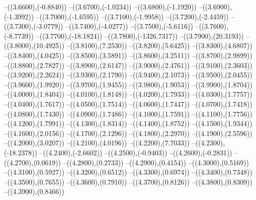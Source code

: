{	--({\sx*(3.6600)},{\sy*(-0.8840)})
	--({\sx*(3.6700)},{\sy*(-1.0234)})
	--({\sx*(3.6800)},{\sy*(-1.1920)})
	--({\sx*(3.6900)},{\sy*(-1.3992)})
	--({\sx*(3.7000)},{\sy*(-1.6595)})
	--({\sx*(3.7100)},{\sy*(-1.9958)})
	--({\sx*(3.7200)},{\sy*(-2.4459)})
	--({\sx*(3.7300)},{\sy*(-3.0779)})
	--({\sx*(3.7400)},{\sy*(-4.0277)})
	--({\sx*(3.7500)},{\sy*(-5.6116)})
	--({\sx*(3.7600)},{\sy*(-8.7739)})
	--({\sx*(3.7700)},{\sy*(-18.1824)})
	--({\sx*(3.7800)},{\sy*(-1326.7317)})
	--({\sx*(3.7900)},{\sy*(20.3193)})
	--({\sx*(3.8000)},{\sy*(10.4925)})
	--({\sx*(3.8100)},{\sy*(7.2530)})
	--({\sx*(3.8200)},{\sy*(5.6425)})
	--({\sx*(3.8300)},{\sy*(4.6807)})
	--({\sx*(3.8400)},{\sy*(4.0425)})
	--({\sx*(3.8500)},{\sy*(3.5891)})
	--({\sx*(3.8600)},{\sy*(3.2511)})
	--({\sx*(3.8700)},{\sy*(2.9899)})
	--({\sx*(3.8800)},{\sy*(2.7827)})
	--({\sx*(3.8900)},{\sy*(2.6147)})
	--({\sx*(3.9000)},{\sy*(2.4761)})
	--({\sx*(3.9100)},{\sy*(2.3603)})
	--({\sx*(3.9200)},{\sy*(2.2624)})
	--({\sx*(3.9300)},{\sy*(2.1790)})
	--({\sx*(3.9400)},{\sy*(2.1073)})
	--({\sx*(3.9500)},{\sy*(2.0455)})
	--({\sx*(3.9600)},{\sy*(1.9920)})
	--({\sx*(3.9700)},{\sy*(1.9455)})
	--({\sx*(3.9800)},{\sy*(1.9053)})
	--({\sx*(3.9900)},{\sy*(1.8704)})
	--({\sx*(4.0000)},{\sy*(1.8404)})
	--({\sx*(4.0100)},{\sy*(1.8148)})
	--({\sx*(4.0200)},{\sy*(1.7933)})
	--({\sx*(4.0300)},{\sy*(1.7757)})
	--({\sx*(4.0400)},{\sy*(1.7617)})
	--({\sx*(4.0500)},{\sy*(1.7514)})
	--({\sx*(4.0600)},{\sy*(1.7447)})
	--({\sx*(4.0700)},{\sy*(1.7418)})
	--({\sx*(4.0800)},{\sy*(1.7430)})
	--({\sx*(4.0900)},{\sy*(1.7486)})
	--({\sx*(4.1000)},{\sy*(1.7591)})
	--({\sx*(4.1100)},{\sy*(1.7756)})
	--({\sx*(4.1200)},{\sy*(1.7991)})
	--({\sx*(4.1300)},{\sy*(1.8314)})
	--({\sx*(4.1400)},{\sy*(1.8752)})
	--({\sx*(4.1500)},{\sy*(1.9344)})
	--({\sx*(4.1600)},{\sy*(2.0156)})
	--({\sx*(4.1700)},{\sy*(2.1296)})
	--({\sx*(4.1800)},{\sy*(2.2970)})
	--({\sx*(4.1900)},{\sy*(2.5596)})
	--({\sx*(4.2000)},{\sy*(3.0207)})
	--({\sx*(4.2100)},{\sy*(4.0196)})
	--({\sx*(4.2200)},{\sy*(7.7033)})
	--({\sx*(4.2300)},{\sy*(-18.2378)})
	--({\sx*(4.2400)},{\sy*(-2.6602)})
	--({\sx*(4.2500)},{\sy*(-0.9403)})
	--({\sx*(4.2600)},{\sy*(-0.2831)})
	--({\sx*(4.2700)},{\sy*(0.0619)})
	--({\sx*(4.2800)},{\sy*(0.2733)})
	--({\sx*(4.2900)},{\sy*(0.4154)})
	--({\sx*(4.3000)},{\sy*(0.5169)})
	--({\sx*(4.3100)},{\sy*(0.5927)})
	--({\sx*(4.3200)},{\sy*(0.6512)})
	--({\sx*(4.3300)},{\sy*(0.6974)})
	--({\sx*(4.3400)},{\sy*(0.7348)})
	--({\sx*(4.3500)},{\sy*(0.7655)})
	--({\sx*(4.3600)},{\sy*(0.7910)})
	--({\sx*(4.3700)},{\sy*(0.8126)})
	--({\sx*(4.3800)},{\sy*(0.8309)})
	--({\sx*(4.3900)},{\sy*(0.8466)})
}
